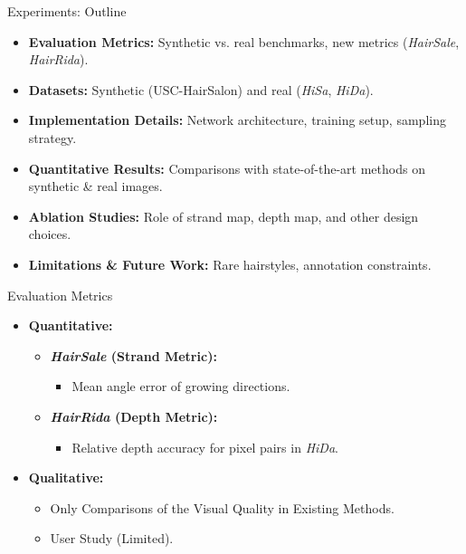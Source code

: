 
\begin{frame}[t]{Experiments: Outline}
    \begin{itemize}
        \item \textbf{Evaluation Metrics:} Synthetic vs. real benchmarks, new metrics (\emph{HairSale}, \emph{HairRida}).
        \item \textbf{Datasets:} Synthetic (USC-HairSalon) and real (\emph{HiSa}, \emph{HiDa}).
        \item \textbf{Implementation Details:} Network architecture, training setup, sampling strategy.
        \item \textbf{Quantitative Results:} Comparisons with state-of-the-art methods on synthetic \& real images.
        \item \textbf{Ablation Studies:} Role of strand map, depth map, and other design choices.
        \item \textbf{Limitations \& Future Work:} Rare hairstyles, annotation constraints.
    \end{itemize}
\end{frame}

\begin{frame}[t]{Evaluation Metrics}
    \begin{itemize}
        \item \textbf{Quantitative:}
        \begin{itemize}
            \item \textbf{\emph{HairSale} (Strand Metric):}
            \begin{itemize}
                \item Mean angle error of growing directions.
            \end{itemize}
            \item \textbf{\emph{HairRida} (Depth Metric):}
            \begin{itemize}
                \item Relative depth accuracy for pixel pairs in \emph{HiDa}.
            \end{itemize}
        \end{itemize}
        \item \textbf{Qualitative:}
        \begin{itemize}
            \item Only Comparisons of the Visual Quality in Existing Methods.
            \item User Study (Limited).
        \end{itemize}
    \end{itemize}
\end{frame}


